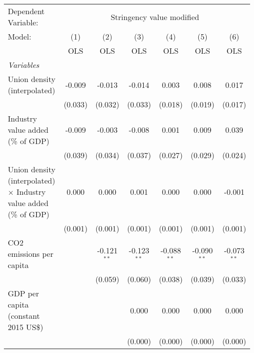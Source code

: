 
\begingroup
\centering
\begin{tabular}{lcccccc}
   \toprule
   Dependent Variable: & \multicolumn{6}{c}{Stringency value modified}\\
   Model:                                                                   & (1)     & (2)           & (3)           & (4)           & (5)           & (6)\\  
                                                                            &  OLS    & OLS           & OLS           & OLS           & OLS           & OLS\\  
   \midrule
   \emph{Variables}\\
   Union density (interpolated)                                             & -0.009  & -0.013        & -0.014        & 0.003         & 0.008         & 0.017\\   
                                                                            & (0.033) & (0.032)       & (0.033)       & (0.018)       & (0.019)       & (0.017)\\   
   Industry value added (\% of GDP)                                         & -0.009  & -0.003        & -0.008        & 0.001         & 0.009         & 0.039\\   
                                                                            & (0.039) & (0.034)       & (0.037)       & (0.027)       & (0.029)       & (0.024)\\   
   Union density (interpolated) $\times$ Industry value added (\% of GDP)   & 0.000   & 0.000         & 0.001         & 0.000         & 0.000         & -0.001\\   
                                                                            & (0.001) & (0.001)       & (0.001)       & (0.001)       & (0.001)       & (0.001)\\   
   CO2 emissions per capita                                                 &         & -0.121$^{**}$ & -0.123$^{**}$ & -0.088$^{**}$ & -0.090$^{**}$ & -0.073$^{**}$\\   
                                                                            &         & (0.059)       & (0.060)       & (0.038)       & (0.039)       & (0.033)\\   
   GDP per capita (constant 2015 US\$)                                      &         &               & 0.000         & 0.000         & 0.000         & 0.000\\   
                                                                            &         &               & (0.000)       & (0.000)       & (0.000)       & (0.000)\\   

\end{tabular}
